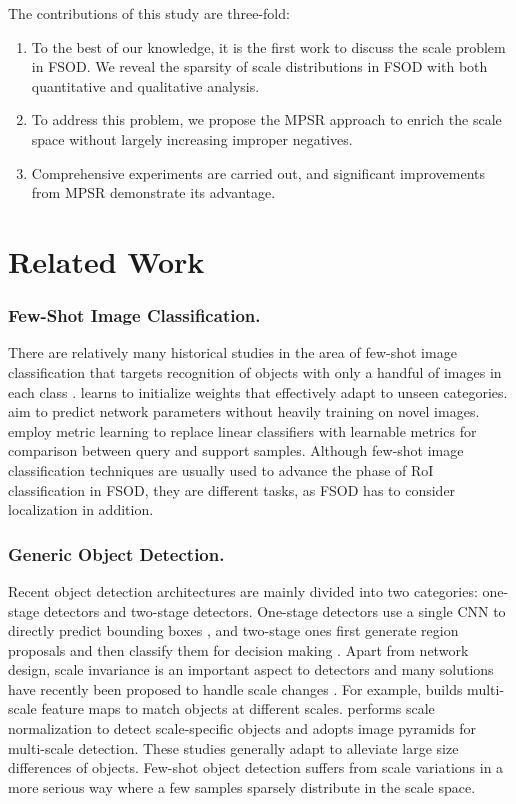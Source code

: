 \documentclass[runningheads]{llncs}
\begin{document}
The contributions of this study are three-fold:
\begin{enumerate}
\item To the best of our knowledge, it is the first work to discuss the scale problem in FSOD. We reveal the sparsity of scale distributions in FSOD with both quantitative and qualitative analysis.
\item To address this problem, we propose the MPSR approach to enrich the scale space without largely increasing improper negatives.
\item Comprehensive experiments are carried out, and significant improvements from MPSR demonstrate its advantage.
\end{enumerate}



\section{Related Work}

\subsubsection{Few-Shot Image Classification.}
There are relatively many historical studies in the area of few-shot image classification that targets recognition of objects with only a handful of images in each class \cite{oneshot,metanet}. 
\cite{maml} learns to initialize weights that effectively adapt to unseen categories. 
\cite{learnet,ppa} aim to predict network parameters without heavily training on novel images. 
\cite{siamese,matchnet,compare} employ metric learning to replace linear classifiers with learnable metrics for comparison between query and support samples. Although few-shot image classification techniques are usually used to advance the phase of RoI classification in FSOD, they are different tasks, as FSOD has to consider localization in addition.

\subsubsection{Generic Object Detection.}
Recent object detection architectures are mainly divided into two categories: one-stage detectors and two-stage detectors. 
One-stage detectors use a single CNN to directly predict bounding boxes \cite{yolo,yolov2,ssd,rfbnet}, and two-stage ones first generate region proposals and then classify them for decision making \cite{rcnn,fastrcnn,fasterrcnn}. 
Apart from network design, scale invariance is an important aspect to detectors and many solutions have recently been proposed to handle scale changes \cite{fpn,snip,sniper,san}. 
For example, \cite{fpn} builds multi-scale feature maps to match objects at different scales. 
\cite{snip} performs scale normalization to detect scale-specific objects and adopts image pyramids for multi-scale detection. 
These studies generally adapt to alleviate large size differences of objects. 
Few-shot object detection suffers from scale variations in a more serious way where a few samples sparsely distribute in the scale space. 
\end{document}

